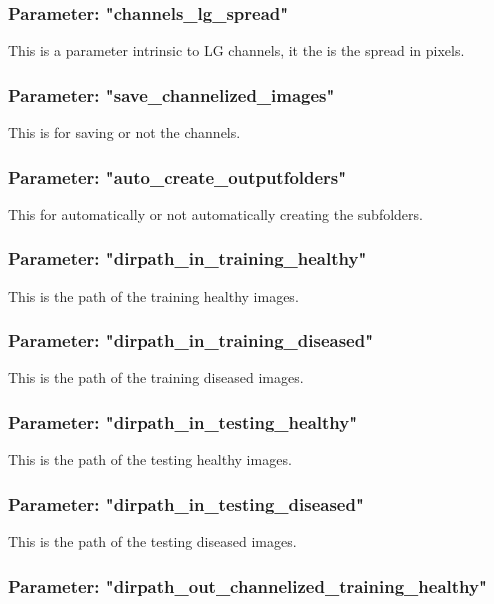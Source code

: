 \subsubsection{Parameter: "channels\_lg\_spread"}

This is a parameter intrinsic to LG channels, it the is the spread in pixels.

\subsubsection{Parameter: "save\_channelized\_images"}

This is for saving or not the channels.

\subsubsection{Parameter: "auto\_create\_outputfolders"}

This for automatically or not automatically creating the subfolders.

\subsubsection{Parameter: "dirpath\_in\_training\_healthy"}

This is the path of the training healthy images.

\subsubsection{Parameter: "dirpath\_in\_training\_diseased"}

This is the path of the training diseased images.

\subsubsection{Parameter: "dirpath\_in\_testing\_healthy"}

This is the path of the testing healthy images.

\subsubsection{Parameter: "dirpath\_in\_testing\_diseased"}

This is the path of the testing diseased images.

\subsubsection{Parameter: "dirpath\_out\_channelized\_training\_healthy"}

